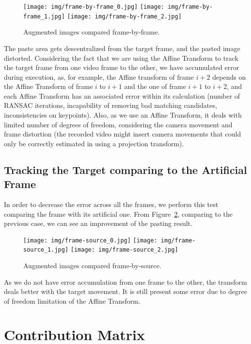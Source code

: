 \documentclass[]{IEEEtran}
\begin{document}
\begin{figure}[H]
  \centering
  \texttt{[image: img/frame-by-frame\_0.jpg]}
  \texttt{[image: img/frame-by-frame\_1.jpg]}
  \texttt{[image: img/frame-by-frame\_2.jpg]}
  \caption{Augmented images compared frame-by-frame.}
  \label{fig:frame-by-frame}
\end{figure}

 The paste area gets descentralized from the target frame, and the pasted image distorted.
Considering the fact that we are using the Affine Transform to track the target frame from one video frame to the other, we have accumulated error during execution, as, for example, the Affine transform of frame $i + 2$ depends on the Affine Transform of frame $i$ to $i + 1$ and the one of frame $i + 1$ to $i + 2$, and each Affine Transform has an associated error within its calculation (number of RANSAC iterations, incapability of removing bad matching candidates, inconsistencies on keypoints). Also, as we use an Affine Transform, it deals with limited number of degrees of freedom, considering the camera movement and frame distortion (the recorded video might insert camera movements that could only be correctly estimated in using a projection transform).

\subsection{Tracking the Target comparing to the Artificial Frame}

In order to decrease the error across all the frames, we perform this test comparing the frame with its artificial one. From Figure~\ref{fig:frame-by-source}, comparing to the previous case, we can see an improvement of the pasting result.

\begin{figure}[H]
  \centering
  \texttt{[image: img/frame-source\_0.jpg]}
  \texttt{[image: img/frame-source\_1.jpg]}
  \texttt{[image: img/frame-source\_2.jpg]}
  \caption{Augmented images compared frame-by-source.}
  \label{fig:frame-by-source}
\end{figure}

As we do not have error accumulation from one frame to the other, the transform deals better with the target movement. It is still present some error due to degree of freedom limitation of the Affine Transform. 

\section{Contribution Matrix}
\end{document}
